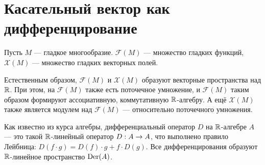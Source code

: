 \documentclass[a4paper]{report}
\begin{document}

    \section{Касательный вектор как дифференцирование}
    Пусть $M$ --- гладкое многообразие. $\mathscr{F}(M)$ --- множество гладких функций, $\mathscr{X}(M)$ --- множество гладких векторных полей.

    Естественным образом, $\mathscr{F}(M)$ и $\mathscr{X}(M)$ образуют векторные пространства над $\mathbb{R}$.
    При этом, на $\mathscr{F}(M)$ также есть поточечное умножение, и $\mathscr{F}(M)$ таким образом формируют ассоциативную, коммутативную $\mathbb{R}$-алгебру.
    А ещё $\mathscr{X}(M)$ также является модулем над $\mathscr{F}(M)$ --- относительно поточечного умножения.

    Как известно из курса алгебры, дифференциальный оператор $D$ на $\mathbb{R}$-алгебре $A$ --- это такой $\mathbb{R}$-линейный оператор $D: A \rightarrow A$, что выполнено правило Лейбница: $D(f \cdot g) = D(f) \cdot g + f \cdot D(g)$.
    Все дифференцирования образуют $\mathbb{R}$-линейное пространство $\operatorname{Der}(A)$.
\end{document}
